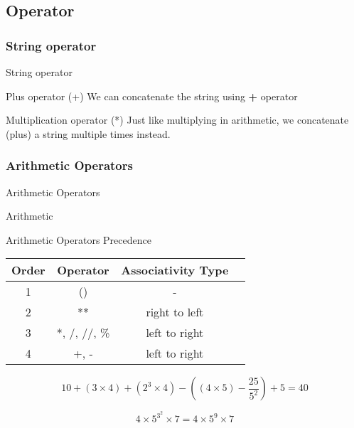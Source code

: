 \documentclass[aspectratio=43]{beamer}
\begin{document}
\subsection[Operator]{Operator}
\subsubsection{String operator}
\begin{frame}{String operator}
    \begin{block}{Plus operator (+)}
        We can concatenate the string using \textbf{+} operator
        
    \end{block}
    \begin{block}{Multiplication operator (*)}
        Just like multiplying in arithmetic, we concatenate (plus) a string multiple times instead.
        
    \end{block}
\end{frame}

\subsubsection{Arithmetic Operators}
\begin{frame}{Arithmetic Operators}
    \begin{block}{Arithmetic}
        
    \end{block}
\end{frame}

\begin{frame}{Arithmetic Operators Precedence}
    \centering
    \begin{tabular}{|c|c|c|c|}
        \hline
        Order & Operator     & Associativity Type \\
        \hline
        1     & ()           & -                  \\
        \hline
        2     & **           & right to left      \\
        \hline
        3     & *, /, //, \% & left to right      \\
        \hline
        4     & +, -         & left to right      \\
        \hline
    \end{tabular}
\end{frame}

\begin{frame}
    \begin{example}
        
        $$
            10 + (3\times4) + (2^3 \times 4) - \left((4\times5) - \frac{25}{5^2}\right) + 5 = 40
        $$
    \end{example}
    \begin{example}
        
        $$
            4 \times 5^{3^2} \times 7 = 4 \times 5^9 \times 7
        $$
    \end{example}
\end{frame}
\end{document}
